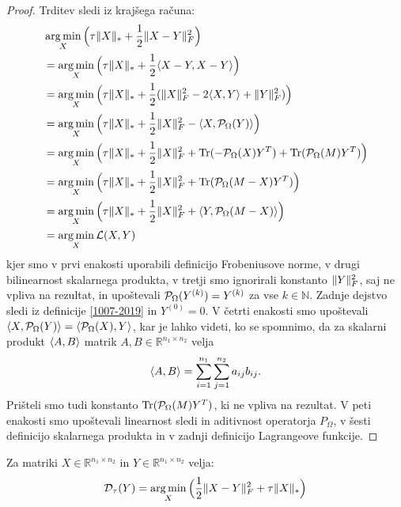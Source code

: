 \begin{proof}
Trditev sledi iz krajšega računa:
\begin{align*}
    &\operatorname*{arg\,min}_X  \Big(\tau\lVert X\rVert_* + \frac{1}{2}\lVert X - Y\rVert_F^2\Big) \\
    &=\operatorname*{arg\,min}_X \Big(\tau\lVert X\rVert_* + \frac{1}{2}\langle X - Y, X - Y \rangle\Big)\\
    &=\operatorname*{arg\,min}_X \Big(\tau\lVert X\rVert_* + \frac{1}{2}(\lVert X\rVert_F^2 - 2\langle X, Y \rangle + \lVert Y\rVert_F^2)\Big) \\ 
    &=\operatorname*{arg\,min}_X \Big(\tau\lVert X\rVert_* + \frac{1}{2}\lVert X\rVert_F^2 - \langle X, \mathcal{P}_\Omega(Y) \rangle\Big)\\
    &=\operatorname*{arg\,min}_X \Big(\tau\lVert X\rVert_* + \frac{1}{2}\lVert X\rVert_F^2 + \operatorname{Tr}(- \mathcal{P}_\Omega(X)Y^T) + \operatorname{Tr}(\mathcal{P}_\Omega(M)Y^T)\Big)\\
    &=\operatorname*{arg\,min}_X \Big(\tau\lVert X\rVert_* + \frac{1}{2}\lVert X\rVert_F^2 + \operatorname{Tr}(\mathcal{P}_\Omega(M - X)Y^T)\Big)\\
    &=\operatorname*{arg\,min}_X \Big(\tau\lVert X\rVert_* + \frac{1}{2}\lVert X\rVert_F^2 + \langle Y, \mathcal{P}_\Omega(M - X) \rangle\Big)\\ 
    &= \operatorname*{arg\,min}_X \mathcal{L}(X, Y)
\end{align*}
kjer smo v prvi enakosti uporabili definicijo Frobeniusove norme, v drugi bilinearnost skalarnega produkta, 
v tretji smo ignorirali konstanto $\lVert Y\rVert_F^2$, saj ne vpliva na rezultat, 
in upoštevali $\mathcal{P}_\Omega(Y^{(k)}) = Y^{(k)}$ za vse $k \in \mathbb{N}$. Zadnje dejstvo sledi iz definicije \eqref{1007-2019} in $Y^{(0)} = 0$. V četrti enakosti smo upoštevali $\langle X, \mathcal{P}_\Omega(Y) \rangle = \langle \mathcal{P}_\Omega(X), Y \rangle$, kar je lahko videti, ko se spomnimo, da za skalarni produkt $\langle A, B \rangle$ matrik $A, B \in \mathbb{R}^{n_1 \times n_2}$ velja 
\[
    \langle A, B \rangle = \sum_{i = 1}^{n_1}\sum_{j = 1}^{n_2} a_{ij}b_{ij}.
\]
Prišteli smo tudi konstanto $\operatorname{Tr}(\mathcal{P}_\Omega(M)Y^T)$, ki ne vpliva na rezultat.
V peti enakosti smo upoštevali linearnost sledi in aditivnost operatorja $P_\Omega$,
v šesti definicijo skalarnega produkta in v zadnji definicijo Lagrangeove funkcije.
\end{proof}
\begin{theorem} \label{1907-2240}
Za matriki $X \in \mathbb{R}^{n_1 \times n_2}$ in 
$Y \in \mathbb{R}^{n_1 \times n_2}$ velja:
\begin{align}
    \label{2906-1056}
    \mathcal{D}_\tau(Y) = \operatorname*{arg\,min}_{X} \Big(\frac{1}{2} \lVert X-Y\rVert_F^2 + \tau\lVert X\rVert_* \Big) 
\end{align}
\end{theorem}

